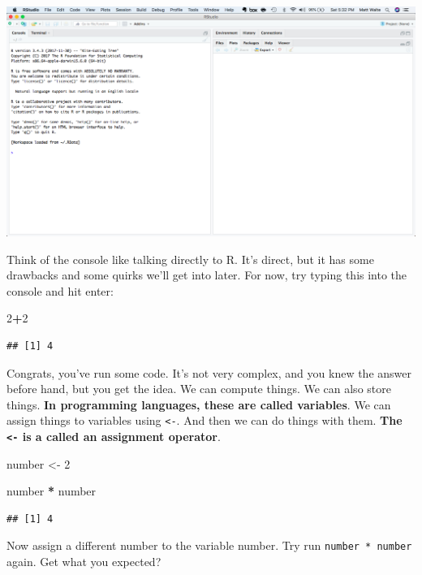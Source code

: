 \documentclass[
]{book}
\newenvironment{Shaded}{\begin{snugshade}}{\end{snugshade}}
\newcommand{\DecValTok}[1]{\textcolor[rgb]{0.00,0.00,0.81}{#1}}
\newcommand{\NormalTok}[1]{#1}
\newcommand{\OperatorTok}[1]{\textcolor[rgb]{0.81,0.36,0.00}{\textbf{#1}}}
\newcommand{\StringTok}[1]{\textcolor[rgb]{0.31,0.60,0.02}{#1}}
\begin{document}
\includegraphics[width=18.97in]{images/verybasics1}

Think of the console like talking directly to R. It's direct, but it has some drawbacks and some quirks we'll get into later. For now, try typing this into the console and hit enter:

\begin{Shaded}
\begin{Highlighting}[]
\DecValTok{2}\OperatorTok{+}\DecValTok{2}
\end{Highlighting}
\end{Shaded}

\begin{verbatim}
## [1] 4
\end{verbatim}

Congrats, you've run some code. It's not very complex, and you knew the answer before hand, but you get the idea. We can compute things. We can also store things. \textbf{In programming languages, these are called variables}. We can assign things to variables using \texttt{\textless{}-}. And then we can do things with them. \textbf{The \texttt{\textless{}-} is a called an assignment operator}.

\begin{Shaded}
\begin{Highlighting}[]
\NormalTok{number <-}\StringTok{ }\DecValTok{2}

\NormalTok{number }\OperatorTok{*}\StringTok{ }\NormalTok{number}
\end{Highlighting}
\end{Shaded}

\begin{verbatim}
## [1] 4
\end{verbatim}

Now assign a different number to the variable number. Try run \texttt{number\ *\ number} again. Get what you expected?
\end{document}
